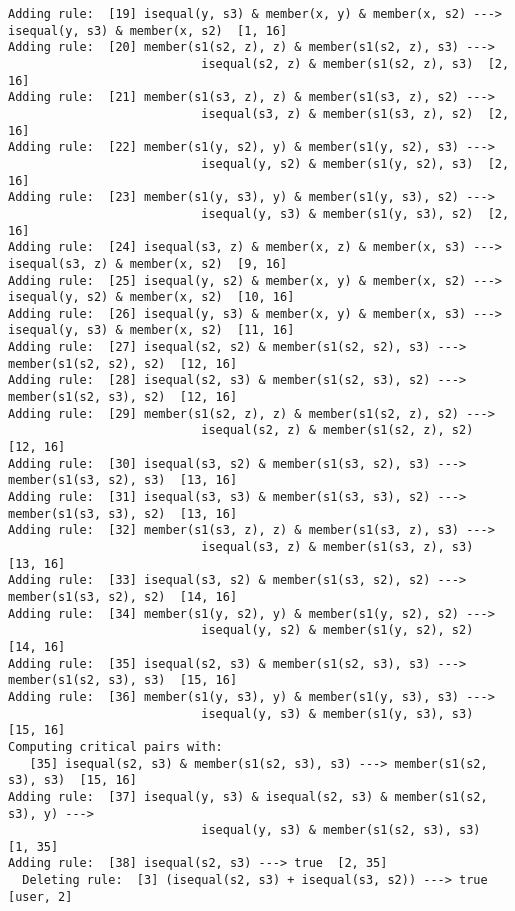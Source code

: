 \begin{verbatim}
Adding rule:  [19] isequal(y, s3) & member(x, y) & member(x, s2) ---> isequal(y, s3) & member(x, s2)  [1, 16]
Adding rule:  [20] member(s1(s2, z), z) & member(s1(s2, z), s3) --->  
                           isequal(s2, z) & member(s1(s2, z), s3)  [2, 16]
Adding rule:  [21] member(s1(s3, z), z) & member(s1(s3, z), s2) --->  
                           isequal(s3, z) & member(s1(s3, z), s2)  [2, 16]
Adding rule:  [22] member(s1(y, s2), y) & member(s1(y, s2), s3) --->  
                           isequal(y, s2) & member(s1(y, s2), s3)  [2, 16]
Adding rule:  [23] member(s1(y, s3), y) & member(s1(y, s3), s2) --->  
                           isequal(y, s3) & member(s1(y, s3), s2)  [2, 16]
Adding rule:  [24] isequal(s3, z) & member(x, z) & member(x, s3) ---> isequal(s3, z) & member(x, s2)  [9, 16]
Adding rule:  [25] isequal(y, s2) & member(x, y) & member(x, s2) ---> isequal(y, s2) & member(x, s2)  [10, 16]
Adding rule:  [26] isequal(y, s3) & member(x, y) & member(x, s3) ---> isequal(y, s3) & member(x, s2)  [11, 16]
Adding rule:  [27] isequal(s2, s2) & member(s1(s2, s2), s3) ---> member(s1(s2, s2), s2)  [12, 16]
Adding rule:  [28] isequal(s2, s3) & member(s1(s2, s3), s2) ---> member(s1(s2, s3), s2)  [12, 16]
Adding rule:  [29] member(s1(s2, z), z) & member(s1(s2, z), s2) --->  
                           isequal(s2, z) & member(s1(s2, z), s2)  [12, 16]
Adding rule:  [30] isequal(s3, s2) & member(s1(s3, s2), s3) ---> member(s1(s3, s2), s3)  [13, 16]
Adding rule:  [31] isequal(s3, s3) & member(s1(s3, s3), s2) ---> member(s1(s3, s3), s2)  [13, 16]
Adding rule:  [32] member(s1(s3, z), z) & member(s1(s3, z), s3) --->  
                           isequal(s3, z) & member(s1(s3, z), s3)  [13, 16]
Adding rule:  [33] isequal(s3, s2) & member(s1(s3, s2), s2) ---> member(s1(s3, s2), s2)  [14, 16]
Adding rule:  [34] member(s1(y, s2), y) & member(s1(y, s2), s2) --->  
                           isequal(y, s2) & member(s1(y, s2), s2)  [14, 16]
Adding rule:  [35] isequal(s2, s3) & member(s1(s2, s3), s3) ---> member(s1(s2, s3), s3)  [15, 16]
Adding rule:  [36] member(s1(y, s3), y) & member(s1(y, s3), s3) --->  
                           isequal(y, s3) & member(s1(y, s3), s3)  [15, 16]
Computing critical pairs with: 
   [35] isequal(s2, s3) & member(s1(s2, s3), s3) ---> member(s1(s2, s3), s3)  [15, 16]
Adding rule:  [37] isequal(y, s3) & isequal(s2, s3) & member(s1(s2, s3), y) --->  
                           isequal(y, s3) & member(s1(s2, s3), s3)  [1, 35]
Adding rule:  [38] isequal(s2, s3) ---> true  [2, 35]
  Deleting rule:  [3] (isequal(s2, s3) + isequal(s3, s2)) ---> true  [user, 2]

\end{verbatim}
